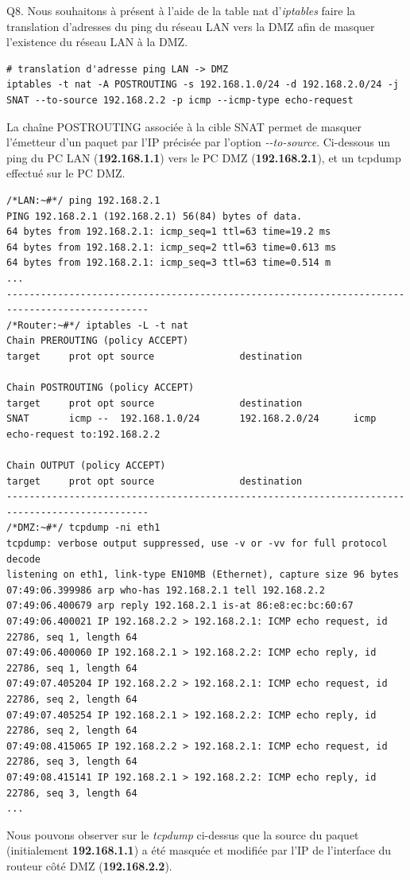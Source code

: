 \documentclass[frenchb, 11pt]{article}
\newlength{\leftbarwidth}
\newlength{\leftbarsep}
\newcommand*{\leftbarcolorcmd}{\color{leftbarcolor}} %
\renewenvironment{leftbar}{%
    \def\FrameCommand{{\leftbarcolorcmd{\vrule width \leftbarwidth\relax\hspace {\leftbarsep}}}}%
    \MakeFramed {\advance \hsize -\width \FrameRestore }%
}{%
    \endMakeFramed
}
\begin{document}
\begin{leftbar}
	\noindent Q8. Nous souhaitons à présent à l'aide de la table nat d'\emph{iptables} faire la translation d'adresses du ping du réseau LAN vers la DMZ afin de masquer l'existence du réseau LAN à la DMZ.
	\begin{lstlisting}[numbers=none]
# translation d'adresse ping LAN -> DMZ
iptables -t nat -A POSTROUTING -s 192.168.1.0/24 -d 192.168.2.0/24 -j SNAT --to-source 192.168.2.2 -p icmp --icmp-type echo-request
	\end{lstlisting}
	La chaîne POSTROUTING associée à la cible SNAT permet de masquer l'émetteur d'un paquet par l'IP précisée par l'option \emph{-\--to-source}. Ci-dessous un ping du PC LAN (\textbf{192.168.1.1}) vers le PC DMZ (\textbf{192.168.2.1}), et un tcpdump effectué sur le PC DMZ.
	\begin{lstlisting}[numbers=none]
/*LAN:~#*/ ping 192.168.2.1
PING 192.168.2.1 (192.168.2.1) 56(84) bytes of data.
64 bytes from 192.168.2.1: icmp_seq=1 ttl=63 time=19.2 ms
64 bytes from 192.168.2.1: icmp_seq=2 ttl=63 time=0.613 ms
64 bytes from 192.168.2.1: icmp_seq=3 ttl=63 time=0.514 m
...
-----------------------------------------------------------------------------------------------
/*Router:~#*/ iptables -L -t nat
Chain PREROUTING (policy ACCEPT)
target     prot opt source               destination         

Chain POSTROUTING (policy ACCEPT)
target     prot opt source               destination         
SNAT       icmp --  192.168.1.0/24       192.168.2.0/24      icmp echo-request to:192.168.2.2 

Chain OUTPUT (policy ACCEPT)
target     prot opt source               destination
-----------------------------------------------------------------------------------------------
/*DMZ:~#*/ tcpdump -ni eth1
tcpdump: verbose output suppressed, use -v or -vv for full protocol decode
listening on eth1, link-type EN10MB (Ethernet), capture size 96 bytes
07:49:06.399986 arp who-has 192.168.2.1 tell 192.168.2.2
07:49:06.400679 arp reply 192.168.2.1 is-at 86:e8:ec:bc:60:67
07:49:06.400021 IP 192.168.2.2 > 192.168.2.1: ICMP echo request, id 22786, seq 1, length 64
07:49:06.400060 IP 192.168.2.1 > 192.168.2.2: ICMP echo reply, id 22786, seq 1, length 64
07:49:07.405204 IP 192.168.2.2 > 192.168.2.1: ICMP echo request, id 22786, seq 2, length 64
07:49:07.405254 IP 192.168.2.1 > 192.168.2.2: ICMP echo reply, id 22786, seq 2, length 64
07:49:08.415065 IP 192.168.2.2 > 192.168.2.1: ICMP echo request, id 22786, seq 3, length 64
07:49:08.415141 IP 192.168.2.1 > 192.168.2.2: ICMP echo reply, id 22786, seq 3, length 64
...
	\end{lstlisting}
	Nous pouvons observer sur le \emph{tcpdump} ci-dessus que la source du paquet (initialement \textbf{192.168.1.1}) a été masquée et modifiée par l'IP de l'interface du routeur côté DMZ (\textbf{192.168.2.2}).
\end{leftbar}
\hfill
\end{document}
